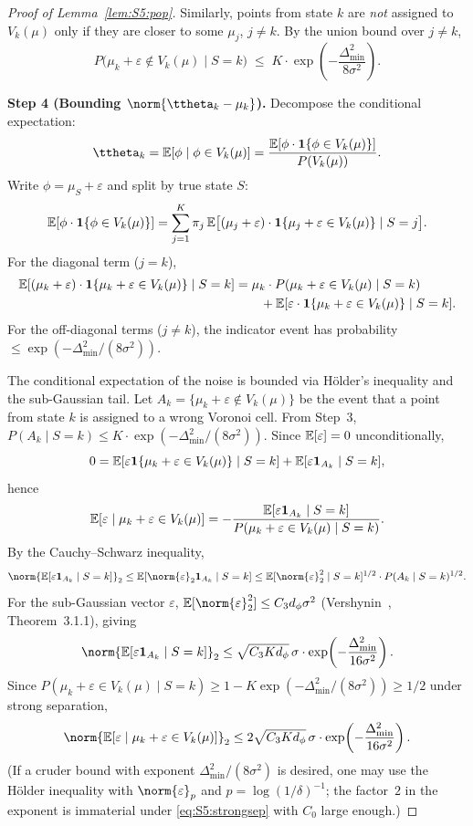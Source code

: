 \begin{proof}[Proof of Lemma~\ref{lem:S5:pop}]
Similarly, points from state $k$ are \emph{not} assigned to $V_k(\mu)$
only if they are closer to some $\mu_j$, $j\neq k$.  By the union bound
over $j\neq k$,
\[
P\bigl(\mu_k+\varepsilon\notin V_k(\mu)\mid S=k\bigr)
\;\le\; K\cdot\exp\!\left(-\frac{\Delta_{\min}^2}{8\sigma^2}\right).
\]

\noindent\textbf{Step 4 (Bounding $\norm{\ttheta_k-\muk}$).}
Decompose the conditional expectation:
\[
\ttheta_k = \E[\phi\mid\phi\in V_k(\mu)]
          = \frac{\E[\phi\cdot\ind\{\phi\in V_k(\mu)\}]}
                 {P(V_k(\mu))}.
\]
Write $\phi=\mu_S+\varepsilon$ and split by true state $S$:
\[
\mathbb{E}[\phi\cdot\mathbf{1}\{\phi\in V_k(\mu)\}]
= \sum_{j=1}^K \pi_j\,
  \mathbb{E}\bigl[(\mu_j+\varepsilon)\cdot\mathbf{1}\{\mu_j+\varepsilon\in V_k(\mu)\}\mid S=j\bigr].
\]
For the diagonal term ($j=k$),
\begin{align*}
\mathbb{E}[(\mu_k+\varepsilon)\cdot\mathbf{1}\{\mu_k+\varepsilon\in V_k(\mu)\}\mid S=k]
&= \mu_k\cdot P(\mu_k+\varepsilon\in V_k(\mu)\mid S=k) \\
&\qquad + \mathbb{E}[\varepsilon\cdot\mathbf{1}\{\mu_k+\varepsilon\in V_k(\mu)\}\mid S=k].
\end{align*}
For the off-diagonal terms ($j\neq k$), the indicator event has
probability $\le\exp(-\Delta_{\min}^2/(8\sigma^2))$.

The conditional expectation of the noise is bounded via H\"older's
inequality and the sub-Gaussian tail.  Let
$A_k=\{\mu_k+\varepsilon\notin V_k(\mu)\}$ be the event that a point from
state $k$ is assigned to a wrong Voronoi cell.  From Step~3,
$P(A_k\mid S=k)\le K\cdot\exp(-\Delta_{\min}^2/(8\sigma^2))$.  Since
$\mathbb{E}[\varepsilon]=0$ unconditionally,
\[
0=\mathbb{E}[\varepsilon\mathbf{1}\{\mu_k+\varepsilon\in V_k(\mu)\}\mid S=k]
  +\mathbb{E}[\varepsilon\mathbf{1}_{A_k}\mid S=k],
\]
hence
\[
\mathbb{E}[\varepsilon\mid\mu_k+\varepsilon\in V_k(\mu)]
=-\frac{\mathbb{E}[\varepsilon\mathbf{1}_{A_k}\mid S=k]}
       {P(\mu_k+\varepsilon\in V_k(\mu)\mid S=k)}.
\]
By the Cauchy--Schwarz inequality,
\[
\norm{\E[\varepsilon\ind_{A_k}\mid S=k]}_2
\le\E[\norm{\varepsilon}_2\ind_{A_k}\mid S=k]
\le\E[\norm{\varepsilon}_2^2\mid S=k]^{1/2}\cdot P(A_k\mid S=k)^{1/2}.
\]
For the sub-Gaussian vector $\varepsilon$,
$\E[\norm{\varepsilon}_2^2]\le C_3 d_\phi\sigma^2$ (Vershynin~\cite{vershynin2018highdimensional},
Theorem~3.1.1), giving
\[
\norm{\E[\varepsilon\ind_{A_k}\mid S=k]}_2
\le\sqrt{C_3 K d_\phi}\,\sigma\cdot
  \exp\!\left(-\frac{\Delta_{\min}^2}{16\sigma^2}\right).
\]
Since $P(\mu_k+\varepsilon\in V_k(\mu)\mid S=k)
\ge 1-K\exp(-\Delta_{\min}^2/(8\sigma^2))\ge 1/2$ under strong separation,
\[
\norm{\E[\varepsilon\mid\mu_k+\varepsilon\in V_k(\mu)]}_2
\le 2\sqrt{C_3 K d_\phi}\,\sigma\cdot
   \exp\!\left(-\frac{\Delta_{\min}^2}{16\sigma^2}\right).
\]
(If a cruder bound with exponent $\Delta_{\min}^2/(8\sigma^2)$ is
desired, one may use the H\"older inequality with
$\norm{\varepsilon}_p$ and $p=\log(1/\delta)^{-1}$; the factor~$2$ in
the exponent is immaterial under \eqref{eq:S5:strongsep} with
$C_0$ large enough.)


\end{proof}
